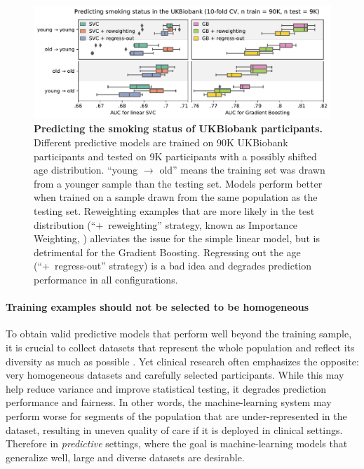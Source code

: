 \documentclass[a4paper,num-refs]{oup-contemporary}
\begin{document}
\begin{figure}[t!]
  \centering
  \includegraphics[width=.7\textwidth]{figures/ukbiobank/smoking_prediction/ukb_smoking_prediction.pdf}
  \caption{\label{fig:ukb-smoking} \textbf{Predicting the smoking status
of UKBiobank participants.} Different predictive models are trained on 90K UKBiobank participants and tested on 9K participants with a possibly shifted age distribution. ``young $\rightarrow$ old'' means the training set was drawn from a younger sample than the testing set. Models perform better when trained on a sample drawn from the same population as the testing set. Reweighting examples that are more likely in the test distribution (``+ reweighting'' strategy, known as Importance Weighting, ) alleviates the issue for the simple linear model, but is detrimental for the Gradient Boosting. Regressing  out the age (``+ regress-out'' strategy) is a bad idea and degrades prediction performance in all configurations.}
\end{figure}

\paragraph{Training examples should not be selected to be homogeneous}
To obtain valid predictive models that perform well beyond the training sample,
it is crucial to collect datasets that represent the whole population and
reflect its diversity as much as possible
\citep{kakarmath2020best,england2019artificial,o2016weapons}. Yet clinical research often
emphasizes the opposite: very
homogeneous datasets and carefully selected participants. While this may help
reduce variance and improve statistical testing, it degrades prediction
performance and fairness. In other words, the machine-learning system may perform worse for segments of the population that are under-represented in the dataset, resulting in uneven quality of care if it is deployed in clinical settings.
Therefore in \emph{predictive} settings, where the goal is 
machine-learning models that generalize well, large and diverse datasets are desirable.
\end{document}
